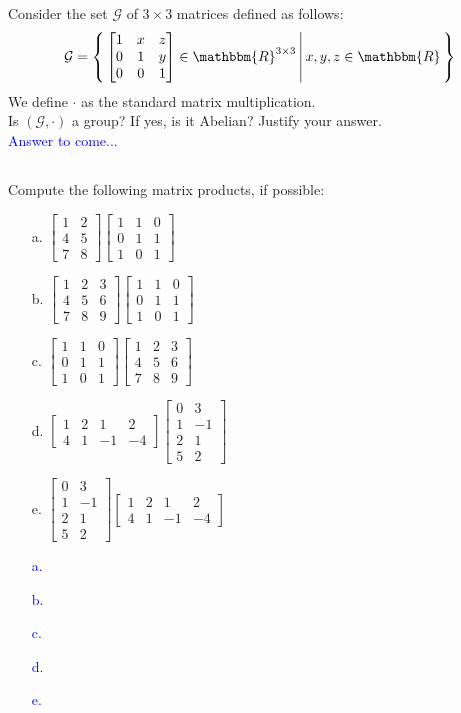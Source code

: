 \documentclass[a4paper,12pt]{article}
\newcommand{\R}{\mathbbm{R}}
\newcommand{\M}[1]{ \begin{bmatrix} #1 \end{bmatrix} }
\newcommand{\vsp}[1]{\vspace{#1mm}\\}
\begin{document}
\subsection{}
Consider the set $\mathcal{G}$ of $3 \times 3$ matrices defined as follows:
$$\mathcal{G} = \left\{ \, \M{1&x&z\\0&1&y\\0&0&1} \in \R^{3 \times 3} \, \middle| \, x,y,z \in \R \, \right\}$$
We define $\cdot$ as the standard matrix multiplication.\\
Is $(\mathcal{G},\cdot)$ a group? If yes, is it Abelian? Justify your answer.
\vsp{3}
\textcolor{blue}{
Answer to come...
}
\subsection{}
Compute the following matrix products, if possible:
\begin{itemize}
 \item [a.] $\M{1&2\\4&5\\7&8} \M{1&1&0\\0&1&1\\1&0&1}$
 \item [b.] $\M{1&2&3\\4&5&6\\7&8&9} \M{1&1&0\\0&1&1\\1&0&1}$
 \item [c.] $\M{1&1&0\\0&1&1\\1&0&1} \M{1&2&3\\4&5&6\\7&8&9}$
 \item [d.] $\M{1&2&1&2\\4&1&-1&-4} \M{0&3\\1&-1\\2&1\\5&2}$
 \item [e.] $\M{0&3\\1&-1\\2&1\\5&2} \M{1&2&1&2\\4&1&-1&-4}$
\end{itemize}
\textcolor{blue}{
\begin{itemize}
 \item [a.] 
 \item [b.] 
 \item [c.] 
 \item [d.] 
 \item [e.]
\end{itemize}
}
\end{document}
